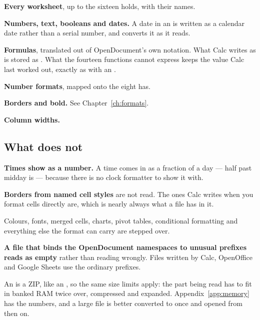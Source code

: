 \begin{ccsteps}
\item \textbf{Every worksheet}, up to the sixteen \ccprod{} holds, with their
names.
\item \textbf{Numbers, text, booleans and dates.} A date in an  is
written as a calendar date rather than a serial number, and \ccprod{} converts
it as it reads.
\item \textbf{Formulas}, translated out of OpenDocument's own notation. What
Calc writes as
is stored as . What the fourteen functions cannot express
keeps the value Calc last worked out, exactly as with an .
\item \textbf{Number formats}, mapped onto the eight \ccprod{} has.
\item \textbf{Borders and bold.} See Chapter~\ref{ch:formats}.
\item \textbf{Column widths.}
\end{ccsteps}

\subsection{What does not}

\begin{ccsteps}
\item \textbf{Times show as a number.} A time comes in as a fraction of a day
--- half past midday is  --- because there is no clock formatter to
show it with.
\item \textbf{Borders from named cell styles} are not read. The ones Calc
writes when you format cells directly are, which is nearly always what a file
has in it.
\item Colours, fonts, merged cells, charts, pivot tables, conditional
formatting and everything else the format can carry are stepped over.
\item \textbf{A file that binds the OpenDocument namespaces to unusual
prefixes reads as empty} rather than reading wrongly. Files written by Calc,
OpenOffice and Google Sheets use the ordinary prefixes.
\end{ccsteps}

\begin{ccnote}
An  is a ZIP, like an , so the same size limits apply:
the part being read has to fit in banked RAM twice over, compressed and
expanded. Appendix~\ref{app:memory} has the numbers, and a large file is
better converted to  once and opened from then on.
\end{ccnote}

